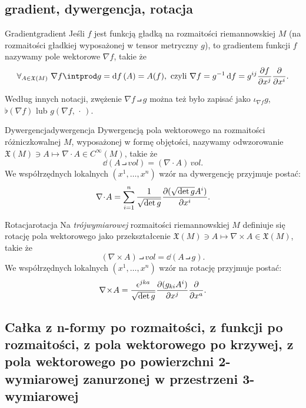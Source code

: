 \documentclass{article}
\newcommand\suni{\sum_{i=1}^{n}}
\begin{document}
\subsection{gradient, dywergencja, rotacja}\label{sec:operatory_różniczkowe}

\begin{dfn}{Gradient}{gradient}
  Jeśli $f$ jest funkcją gładką na rozmaitości riemannowskiej $M$ (na rozmaitości gładkiej wyposażonej w tensor metryczny $g$), to gradientem funkcji $f$ nazywamy pole wektorowe $\nabla{f}$, takie że
  \[
  \forall_{A\in\mathfrak{X}(M)}\ \nabla{f}\intprod g = \dd{f}(A) = A(f),\text{ czyli } \nabla{f} = g^{-1}\dd{f} = g^{ij}\pdv{f}{x^j}\pdv{x^i}.
  \]
\end{dfn}

Według innych notacji, zwężenie $\nabla{f}\intprod g$ można też było zapisać jako $\iota_{\nabla{f}} g$, $\flat(\nabla f)$ lub $g(\nabla f,\,\cdot\,)$.

\begin{dfn}{Dywergencja}{dywergencja}
  Dywergencją pola wektorowego na rozmaitości różniczkowalnej $M$, wyposażonej w formę objętości, nazywamy odwzorowanie $\mathfrak{X}(M)\ni A\mapsto \nabla\!\cdot\! A\in C^\infty(M)$, takie że
  \[
  \dd{(A\intprod vol)} = (\nabla\!\cdot\! A)\, vol.
  \]
  We współrzędnych lokalnych $(x^1,\ldots,x^n)$ wzór na dywergencję przyjmuje postać:
  \[
  \nabla\!\cdot\! A = \suni \frac{1}{\sqrt{\det g}} \pdv{(\sqrt{\det g} A^i)}{x^i}.
  \]
\end{dfn}

\begin{dfn}{Rotacja}{rotacja}
  Na \textit{trójwymiarowej} rozmaitości riemannowskiej $M$ definiuje się rotację pola wektorowego jako przekształcenie $\mathfrak{X}(M)\ni A\mapsto \nabla\!\times\! A\in \mathfrak{X}(M)$, takie że
  \[
  (\nabla\!\times\!A)\intprod vol = \dd{(A\intprod g)}.
  \]
  We współrzędnych lokalnych $(x^1,\ldots,x^n)$ wzór na rotację przyjmuje postać:
  \[
  \nabla\!\times\!A = \frac{\epsilon^{jka}}{\sqrt{\det g}}\pdv{(g_{ki} A^i)}{x^j}\pdv{x^a}.
  \]
\end{dfn}








\subsection{Całka z n-formy po rozmaitości, z funkcji po rozmaitości, z pola wektorowego po krzywej, z pola wektorowego po powierzchni 2-wymiarowej zanurzonej w przestrzeni 3-wymiarowej}
\end{document}
